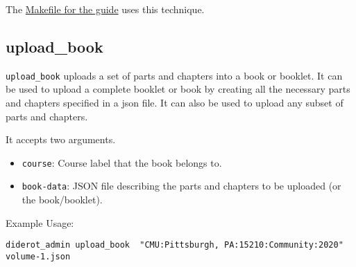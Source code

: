 \begin{gram}
The \href{file://cli/attachments/Makefile-guide}{Makefile for the guide} uses this technique.

\end{gram}

\subsection{upload\_book}

\begin{gram}
\verb|upload_book| uploads a set of parts and chapters into a book or booklet.
%
It can be used to upload a complete booklet or book by creating all
the necessary parts and chapters specified in a json file.
%
It can also be used to upload any subset of parts and chapters.

It accepts two arguments.
%
\begin{itemize}
  \item \verb|course|: Course label that the book belongs to.
  \item \verb|book-data|: JSON file describing the parts and chapters to be uploaded (or the book/booklet).
\end{itemize}
\end{gram}

Example Usage:
\begin{verbatim}
diderot_admin upload_book  "CMU:Pittsburgh, PA:15210:Community:2020" volume-1.json
\end{verbatim}
%
 
